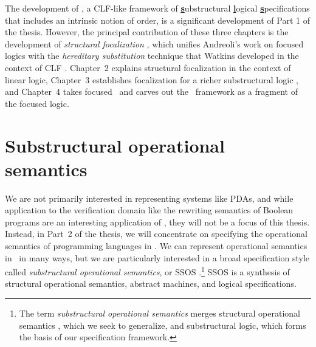 The development of \sls, a CLF-like framework of \underline{\bf
  s}ubstructural \underline{\bf l}ogical \underline{\bf
  s}pecifications that includes an intrinsic notion of order, is a
significant development of Part 1 of the thesis.  However, the
principal contribution of these three chapters is the development of
{\it structural focalization} \cite{simmons11structural}, which
unifies Andreoli's work on focused logics \cite{andreoli92logic} with
the {\it hereditary substitution} technique that Watkins developed in
the context of CLF \cite{watkins02concurrent}. Chapter~2 explains
structural focalization in the context of linear logic, Chapter~3
establishes focalization for a richer substructural logic \ollll, and
Chapter~4 takes focused \ollll~and carves out the \sls~framework as a
fragment of the focused logic.

\section{Substructural operational semantics}
\label{sec:intro-ssos}

We are not primarily interested in representing systems like PDAs, and
while application to the verification domain like the rewriting
semantics of Boolean programs are an interesting application of \sls,
they will not be a focus of this thesis. Instead, in Part~2 of the
thesis, we will concentrate on specifying the operational semantics of
programming languages in \sls.
%
We can represent operational semantics in
\sls~in many ways, but we are particularly interested in a broad
specification style called {\it substructural operational semantics},
or SSOS
\cite{pfenning04substructural,pfenning09substructural}.\footnote{The
  term {\it substructural operational semantics} merges structural
  operational semantics \cite{plotkin04structural}, which we seek to
  generalize, and substructural logic, which forms the basis of our
  specification framework.} SSOS is a synthesis of structural
operational semantics, abstract machines, and logical specifications.

